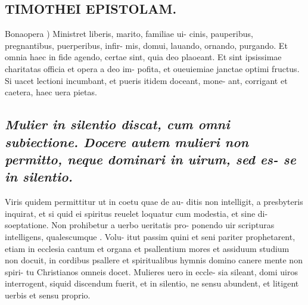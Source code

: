 \documentclass{article}
\begin{document}
\begin{pages}
\section*{TIMOTHEI EPISTOLAM. }
\marginpar{[ p.60 ]}\pstart Bonaopera ) Ministret liberis, marito, familiae ui- cinis, pauperibus, pregnantibus, puerperibus, infir- mis, domui, lauando, ornando, purgando. Et omnia haec in fide agendo, certae sint, quia deo plaoeant. Et sint ipsissimae charitatas officia et opera a deo im- pofita, et oueuiemiae janctae optimi fructus. Si uacet lectioni incumbant, et pueris itidem doceant, mone- ant, corrigant et caetera, haec uera pietas.  \pend
{}
{}
\subsection*{\textit{Mulier in silentio discat, cum omni subiectione. Docere autem mulieri non permitto, neque dominari in uirum, sed es- se in silentio. }}\pstart Viris quidem permittitur ut in coetu quae de au- ditis non intelligit, a presbyteris inquirat, et si quid ei spiritus reuelet loquatur cum modestia, et sine di- soeptatione. Non prohibetur a uerbo ueritatis pro- ponendo uir scripturas intelligens, qualescumque . Volu- itut passim quini et seni pariter prophetarent, etiam in ecclesia cantum et organa et psallentium mores et assiduum studium non docuit, in cordibus psallere et spiritualibus hymnis domino canere mente non spiri- tu Christianos omneis docet. Mulieres uero in eccle- sia sileant, domi uiros interrogent, siquid discendum fuerit, et in silentio, ne sensu abundent, et litigent uerbis et sensu proprio.  \pend

\end{pages}
\end{document}
